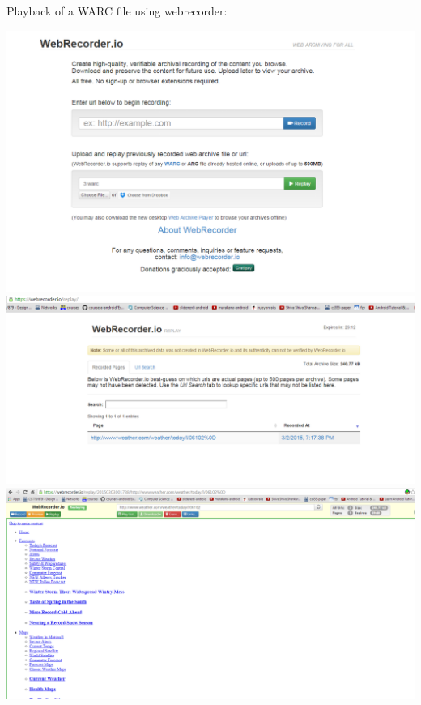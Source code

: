 \documentclass[paper=a4, fontsize=11pt]{scrartcl} %
\numberwithin{equation}{section} %
\numberwithin{figure}{section} %
\numberwithin{table}{section} %
\begin{document}
Playback of a WARC file using webrecorder:
\begin{center}
\includegraphics[scale=.7]{web1.png}
\includegraphics[scale=.5]{web2.png}
\includegraphics[scale=.4]{web3.png}
\end{center}
\end{document}

